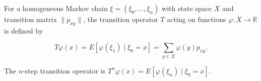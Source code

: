 For a homogeneous Markov chain $\xi = (\xi_0, \ldots, \xi_n)$ with state space $X$ and transition matrix $\|p_{xy}\|$, the transition operator $T$ acting on functions $\varphi : X \to \mathbb{R}$ is defined by

$$T\varphi(x) = E[\varphi(\xi_1) \mid \xi_0 = x] = \sum_{y \in X} \varphi(y) p_{xy}.$$

The $n$-step transition operator is $T^n \varphi(x) = E[\varphi(\xi_n) \mid \xi_0 = x]$.
